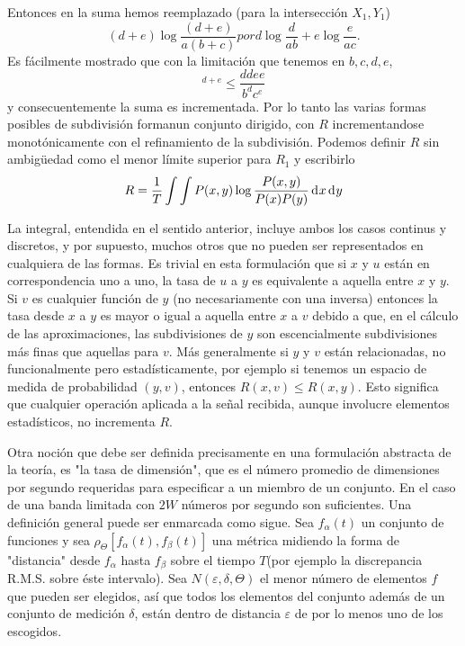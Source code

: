 \begin{appendices}
Entonces en la suma hemos reemplazado (para la intersecci\'on $X_{1}, Y_{1}$)
\begin{equation} (d + e) \log 
\frac{(d + e)}{a(b + c)}   por  d \log \frac{d}{ab} 
+ e \log \frac{e}{ac}. \end{equation}
Es f\'acilmente mostrado que con la limitaci\'on que tenemos en $b, c,
d, e$,
\begin{equation} 
[\frac{d + e}{b + c}]^{d+e}  \leq \frac{d{d} e{e}}{b^{d} c^{e}} \end{equation}
y consecuentemente la suma es incrementada. Por lo tanto las varias formas posibles
de subdivisi\'on formanun conjunto dirigido, con $R$ incrementandose monot\'onicamente
con el refinamiento de la subdivisi\'on. Podemos definir $R$ sin ambigüedad como el
menor l\'imite superior para $R_{1}$ y escribirlo
\begin{equation} R = \frac{1}{T} \int \int P(x,y) \log 
\frac{P(x,y)}{P(x) P(y)}  \diff x   \diff y  \end{equation}
			
La integral, entendida en el sentido anterior, incluye ambos los casos
continus y discretos, y por supuesto, muchos otros que no pueden ser
representados en cualquiera de las formas. Es trivial en esta
formulaci\'on que si $x$ y $u$ est\'an en correspondencia uno a uno,
la tasa de $u$ a $y$ es equivalente a aquella entre $x$ y $y$. Si $v$
es cualquier funci\'on de $y$ (no necesariamente con una inversa)
entonces la tasa desde $x$ a $y$ es mayor o igual a aquella entre $x$
a $v$ debido a que, en el c\'alculo de las aproximaciones, las
subdivisiones de $y$ son escencialmente subdivisiones m\'as finas que
aquellas para $v$.  M\'as generalmente si $y$ y $v$ est\'an
relacionadas, no funcionalmente pero estad\'isticamente, por ejemplo
si tenemos un espacio de medida de probabilidad $(y, v)$, entonces
$R(x,v) \leq R(x,y)$. Esto significa que cualquier operaci\'on
aplicada a la señal recibida, aunque involucre elementos
estad\'isticos, no incrementa $R$.

Otra noci\'on que debe ser definida precisamente en una formulaci\'on
abstracta de la teor\'ia, es "la tasa de dimensi\'on", que es el
n\'umero promedio de dimensiones por segundo requeridas para
especificar a un miembro de un conjunto. En el caso de una banda
limitada con $2W$ n\'umeros por segundo son suficientes. Una
definici\'on general puede ser enmarcada como sigue.  Sea
$f_{\alpha}(t)$ un conjunto de funciones y sea $\rho_{\Theta} \left
[f_{\alpha}(t),f_{\beta}(t) \right ]$ una m\'etrica midiendo la forma
de "distancia" desde $f_{\alpha}$ hasta $f_{\beta}$ sobre el tiempo
$T$(por ejemplo la discrepancia R.M.S. sobre \'este intervalo). Sea
$N(\varepsilon, \delta, \Theta)$ el menor n\'umero de elementos $f$
que pueden ser elegidos, as\'i que todos los elementos del conjunto
adem\'as de un conjunto de medici\'on $\delta$, est\'an dentro de
distancia $\varepsilon$ de por lo menos uno de los escogidos.


\end{appendices}
